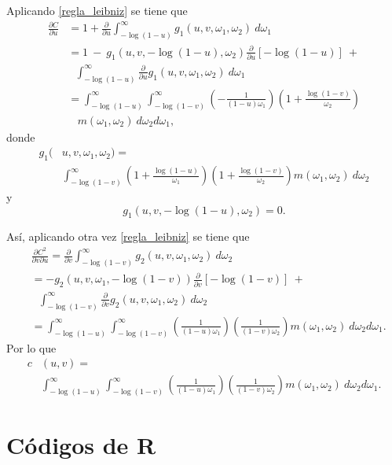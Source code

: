 \documentclass[11pt,a4paper]{article}
\begin{document}
\begin{appendices}
Aplicando \eqref{regla_leibniz} se tiene que
\begin{align*}
\frac{\partial C}{\partial u} &= 1 + \frac{\partial}{\partial u} \int_{-\log (1-u)}^\infty g_1(u, v, \omega_1, \omega_2) \ d\omega_1\\
&= 1 \ - \ g_1(u, v, -\log (1-u), \omega_2)\frac{\partial}{\partial u}\left[ -\log (1-u) \right] \ +\\
& \ \ \ \int_{-\log (1-u)}^{\infty} \frac{\partial}{\partial u}g_1(u, v, \omega_1, \omega_2) \ d\omega_1\\
&= \int_{-\log (1-u)}^\infty \int_{-\log (1-v)}^\infty \left(-\frac{1}{(1-u)\omega_1}\right)\left(1+\frac{\log (1-v)}{\omega_2}\right)\\
&\ \ \ \ m(\omega_1, \omega_2) \ d\omega_2 d\omega_1,
\end{align*}
donde
\begin{align*}
g_1(&u, v, \omega_1, \omega_2) =\\
&\int_{-\log (1-v)}^\infty \left(1+\frac{\log (1-u)}{\omega_1}\right)\left(1+\frac{\log (1-v)}{\omega_2}\right) m(\omega_1, \omega_2) \ d\omega_2
\end{align*}
y $$g_1(u, v, -\log (1-u), \omega_2) = 0.$$

Así, aplicando otra vez \eqref{regla_leibniz} se tiene que
\begin{align*}
&\frac{\partial C^2}{\partial v \partial u} = \frac{\partial}{\partial v} \int_{-\log (1-v)}^\infty g_2(u, v, \omega_1, \omega_2) \ d\omega_2\\
&= -g_2(u, v, \omega_1, -\log (1-v))\frac{\partial}{\partial v}\left[ -\log (1-v)\right] \ +\\
&\ \ \ \int_{-\log (1-v)}^\infty \frac{\partial}{\partial v}g_2(u, v, \omega_1, \omega_2) \ d\omega_2\\
&= \int_{-\log (1-u)}^\infty \int_{- \log (1-v)}^\infty \left(\frac{1}{(1-u)\omega_1}\right)\left(\frac{1}{(1-v)\omega_2}\right) m(\omega_1, \omega_2) \ d\omega_2 d\omega_1.
\end{align*}
Por lo que
\begin{align*}
c&(u, v) =\\
&\int_{-\log (1-u)}^\infty \int_{- \log (1-v)}^\infty \left(\frac{1}{(1-u)\omega_1}\right)\left(\frac{1}{(1-v)\omega_2}\right) m(\omega_1, \omega_2) \ d\omega_2 d\omega_1.
\end{align*}

\newpage

\section{Códigos de R}

\end{appendices}
\end{document}
